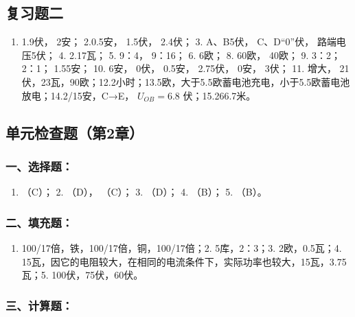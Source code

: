 \subsection{复习题二}\label{ux590dux4e60ux9898ux4e8c-1}

\begin{enumerate}
\def\labelenumi{\arabic{enumi}.}
\tightlist
\item
  1.9伏， 2安； 2.0.5安， 1.5伏， 2.4伏； 3. A、B5伏， C、D``0''伏，
  路端电压5伏； 4. 2.17瓦； 5. 9：4， 9：16； 6. 6欧； 8. 60欧， 40欧；
  9. 3：2； 2：1； 1.55安； 10. 6安， 0伏， 0.5安， 2.75伏， 0安， 3伏；
  11. 增大，
  21伏，23瓦，90欧；12.2小时；13.5欧，大于5.5欧蓄电池充电，小于5.5欧蓄电池放电；14.2/15安，C→E，
  \(U_{OB}=6.8\) 伏；15.266.7米。
\end{enumerate}

\subsection{单元检查题（第2章）}\label{ux5355ux5143ux68c0ux67e5ux9898ux7b2c2ux7ae0-1}

\subsubsection{一、选择题：}\label{ux4e00ux9009ux62e9ux9898-2}

\begin{enumerate}
\def\labelenumi{\arabic{enumi}.}
\tightlist
\item
  （C）； 2. （D）， （C）； 3. （D）； 4. （B）； 5. （B）。
\end{enumerate}

\subsubsection{二、填充题：}\label{ux4e8cux586bux5145ux9898-2}

\begin{enumerate}
\def\labelenumi{\arabic{enumi}.}
\tightlist
\item
  100/17倍，铁，100/17倍，铜，100/17倍；2. 5库，2：3；3. 2欧，0.5瓦；4.
  15瓦，因它的电阻较大，在相同的电流条件下，实际功率也较大，15瓦，3.75瓦；5.
  100伏，75伏，60伏。
\end{enumerate}

\subsubsection{三、计算题：}\label{ux4e09ux8ba1ux7b97ux9898-1}

